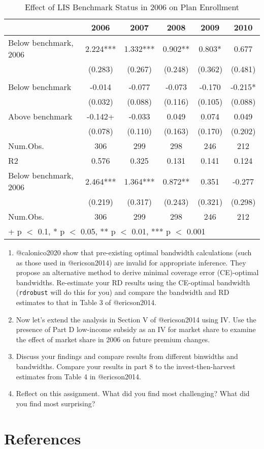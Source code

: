 \documentclass[
  12pt,
]{article}
\begin{document}
\begin{table}

\caption{Effect of LIS Benchmark Status in 2006 on Plan Enrollment}
\centering
\begin{tabular}[t]{lccccc}
\toprule
  & 2006 & 2007 & 2008 & 2009 & 2010\\
\midrule
Below benchmark, 2006 & 2.224*** & 1.332*** & 0.902** & 0.803* & 0.677\\
 & (0.283) & (0.267) & (0.248) & (0.362) & (0.481)\\
\addlinespace[0.3em]
\multicolumn{6}{l}{Premium—subsidy, 2006}\\
\hspace{1em}Below benchmark & -0.014 & -0.077 & -0.073 & -0.170 & -0.215*\\
\hspace{1em} & (0.032) & (0.088) & (0.116) & (0.105) & (0.088)\\
\hspace{1em}Above benchmark & -0.142+ & -0.033 & 0.049 & 0.074 & 0.049\\
\hspace{1em} & (0.078) & (0.110) & (0.163) & (0.170) & (0.202)\\
Num.Obs. & 306 & 299 & 298 & 246 & 212\\
R2 & 0.576 & 0.325 & 0.131 & 0.141 & 0.124\\
\midrule
Below benchmark, 2006 & 2.464*** & 1.364*** & 0.872** & 0.351 & -0.277\\
 & (0.219) & (0.317) & (0.243) & (0.321) & (0.298)\\
Num.Obs. & 306 & 299 & 298 & 246 & 212\\
\bottomrule
\multicolumn{6}{l}{\rule{0pt}{1em}+ p $<$ 0.1, * p $<$ 0.05, ** p $<$ 0.01, *** p $<$ 0.001}\\
\end{tabular}
\end{table}

\begin{enumerate}
\def\labelenumi{\arabic{enumi}.}
\item
  @calonico2020 show that pre-existing optimal bandwidth calculations
  (such as those used in @ericson2014) are invalid for appropriate
  inference. They propose an alternative method to derive minimal
  coverage error (CE)-optimal bandwidths. Re-estimate your RD results
  using the CE-optimal bandwidth (\texttt{rdrobust} will do this for
  you) and compare the bandwidth and RD estimates to that in Table 3 of
  @ericson2014.
\item
  Now let's extend the analysis in Section V of @ericson2014 using IV.
  Use the presence of Part D low-income subsidy as an IV for market
  share to examine the effect of market share in 2006 on future premium
  changes.
\item
  Discuss your findings and compare results from different binwidths and
  bandwidths. Compare your results in part 8 to the invest-then-harvest
  estimates from Table 4 in @ericson2014.
\item
  Reflect on this assignment. What did you find most challenging? What
  did you find most surprising?
\end{enumerate}

\hypertarget{references}{%
\section{References}\label{references}}
\end{document}
